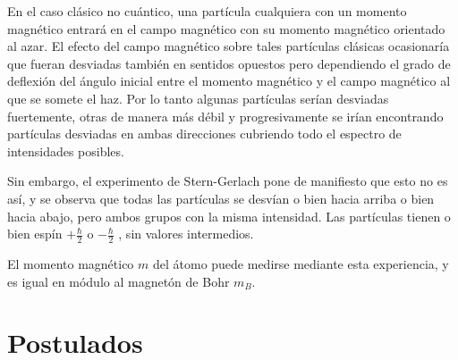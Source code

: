 En el caso clásico no cuántico, una partícula cualquiera con un momento magnético entrará en el campo magnético con su momento magnético orientado al azar. El efecto del campo magnético sobre tales partículas clásicas ocasionaría que fueran desviadas también en sentidos opuestos pero dependiendo el grado de deflexión del ángulo inicial entre el momento magnético y el campo magnético al que se somete el haz. Por lo tanto algunas partículas serían desviadas fuertemente, otras de manera más débil y progresivamente se irían encontrando partículas desviadas en ambas direcciones cubriendo todo el espectro de intensidades posibles.

Sin embargo, el experimento de Stern-Gerlach pone de manifiesto que esto no es así, y se observa que todas las partículas se desvían o bien hacia arriba o bien hacia abajo, pero ambos grupos con la misma intensidad. Las partículas tienen o bien espín ${\displaystyle +{\frac {\hbar }{2}}}$ o 
${\displaystyle -{\frac {\hbar }{2}}}$ , sin valores intermedios.

El momento magnético $m$ del átomo puede medirse mediante esta experiencia, y es igual en módulo al magnetón de Bohr $m_B$.









\section{Postulados}

